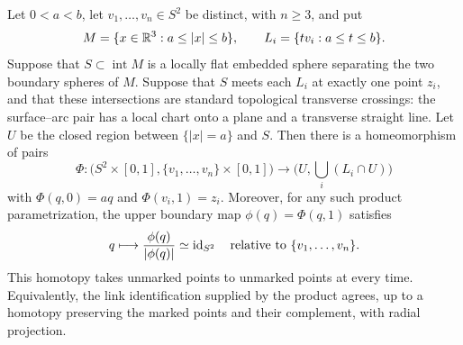 \begin{lemma}\label{lt:punctured-product}\label{lt:ray-product}
Let $0<a<b$, let $v_1,\ldots,v_n\in S^2$ be distinct, with $n\geq3$, and put
\[
 M=\{x\in\mathbb R^3:a\leq |x|\leq b\},\qquad
 L_i=\{t v_i:a\leq t\leq b\}.
\]
Suppose that $S\subset\operatorname{int}M$ is a locally flat embedded
sphere separating the two boundary spheres of $M$.  Suppose that $S$
meets each $L_i$ at exactly one point $z_i$, and that these intersections
are standard topological transverse crossings: the surface--arc pair
has a local chart onto a plane and a transverse straight line.
Let $U$ be the closed region between $\{|x|=a\}$ and $S$.
Then there is a homeomorphism of pairs
\[
 \Phi:\bigl(S^2\times[0,1],\{v_1,\ldots,v_n\}\times[0,1]\bigr)
 \longrightarrow
 \bigl(U,\textstyle\bigcup_i(L_i\cap U)\bigr)
\]
with $\Phi(q,0)=a q$ and $\Phi(v_i,1)=z_i$.
Moreover, for any such product parametrization, the upper boundary map
$\phi(q)=\Phi(q,1)$ satisfies
\[
 q\longmapsto \frac{\phi(q)}{|\phi(q)|}\simeq\operatorname{id}_{S^2}
 \quad\text{relative to }\{v_1,\ldots,v_n\}.
\]
This homotopy takes unmarked points to unmarked points at every time.
Equivalently, the link identification supplied by the product agrees,
up to a homotopy preserving the marked points and their complement,
with radial projection.
\end{lemma}

